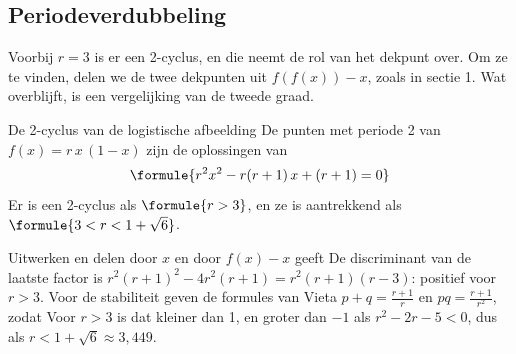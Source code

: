 

\begin{oefeningen}
\end{oefeningen}

\subsection{Periodeverdubbeling}

Voorbij $r = 3$ is er een 2-cyclus, en die neemt de rol van het dekpunt over. Om ze te vinden, delen we de twee dekpunten uit $f(f(x)) - x$, zoals in sectie 1. Wat overblijft, is een vergelijking van de tweede graad.

\begin{theorie}
\begin{stelling}{De 2-cyclus van de logistische afbeelding}
De punten met periode 2 van $f(x) = r\,x\,(1 - x)$ zijn de oplossingen van
\[
\formule{r^2 x^2 - r(r + 1)\,x + (r + 1) = 0}
\]
Er is een 2-cyclus als $\formule{r > 3}$, en ze is aantrekkend als $\formule{3 < r < 1 + \sqrt6}$.
\end{stelling}

\begin{bewijs}
Uitwerken en delen door $x$ en door $f(x) - x$ geeft
De discriminant van de laatste factor is $r^2(r + 1)^2 - 4r^2(r + 1) = r^2(r + 1)(r - 3)$: positief voor $r > 3$. Voor de stabiliteit geven de formules van Vieta $p + q = \tfrac{r + 1}{r}$ en $pq = \tfrac{r + 1}{r^2}$, zodat
Voor $r > 3$ is dat kleiner dan 1, en groter dan $-1$ als $r^2 - 2r - 5 < 0$, dus als $r < 1 + \sqrt6 \approx 3{,}449$.
\end{bewijs}
\end{theorie}

